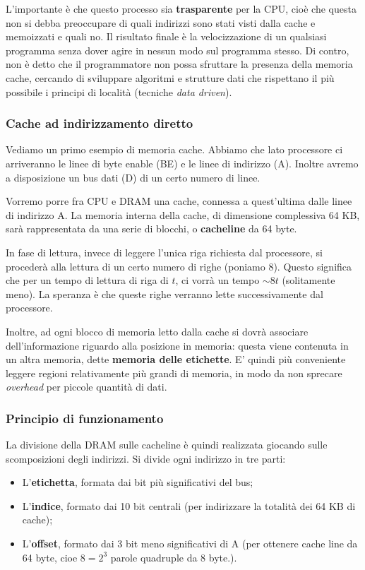 \documentclass[a4paper,11pt]{article}
\begin{document}
L'importante è che questo processo sia \textbf{trasparente} per la CPU, cioè che questa non si debba preoccupare di quali indirizzi sono stati visti dalla cache e memoizzati e quali no.
Il risultato finale è la velocizzazione di un qualsiasi programma senza dover agire in nessun modo sul programma stesso.
Di contro, non è detto che il programmatore non possa sfruttare la presenza della memoria cache, cercando di sviluppare algoritmi e strutture dati che rispettano il più possibile i principi di località (tecniche \textit{data driven}).

\subsubsection{Cache ad indirizzamento diretto}
Vediamo un primo esempio di memoria cache.
Abbiamo che lato processore ci arriveranno le linee di byte enable (BE) e le linee di indirizzo (A).
Inoltre avremo a disposizione un bus dati (D) di un certo numero di linee.

Vorremo porre fra CPU e DRAM una cache, connessa a quest'ultima dalle linee di indirizzo A.
La memoria interna della cache, di dimensione complessiva 64 KB, sarà rappresentata da una serie di blocchi, o \textbf{cacheline} da 64 byte.

In fase di lettura, invece di leggere l'unica riga richiesta dal processore, si procederà alla lettura di un certo numero di righe (poniamo 8).
Questo significa che per un tempo di lettura di riga di $t$, ci vorrà un tempo $\sim 8t$ (solitamente meno).
La speranza è che queste righe verranno lette successivamente dal processore.

Inoltre, ad ogni blocco di memoria letto dalla cache si dovrà associare dell'informazione riguardo alla posizione in memoria: questa viene contenuta in un altra memoria, dette \textbf{memoria delle etichette}.
E' quindi più conveniente leggere regioni relativamente più grandi di memoria, in modo da non sprecare \textit{overhead} per piccole quantità di dati.

\subsubsection{Principio di funzionamento}
La divisione della DRAM sulle cacheline è quindi realizzata giocando sulle scomposizioni degli indirizzi.
Si divide ogni indirizzo in tre parti:
\begin{itemize}
	\item L'\textbf{etichetta}, formata dai bit più significativi del bus;
	\item L'\textbf{indice}, formato dai 10 bit centrali (per indirizzare la totalità dei 64 KB di cache);
	\item L'\textbf{offset}, formato dai 3 bit meno significativi di A (per ottenere cache line da 64 byte, cioe $8 = 2^3$ parole quadruple da 8 byte.). 
\end{itemize}
\end{document}
